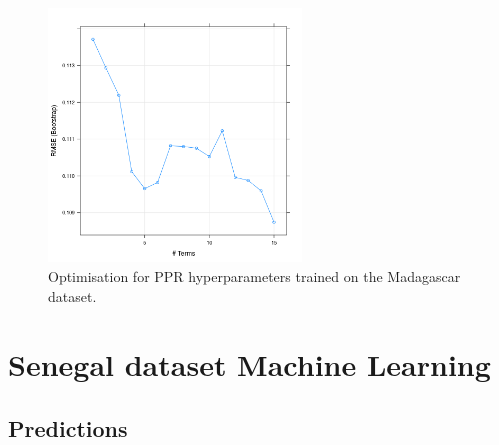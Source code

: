 \documentclass[review]{elsarticle}
\begin{document}
\begin{figure}[h!]
  \centering
  \includegraphics[width=0.6\textwidth]{figs/SI/ppropt_mdg.png}
\caption{
  Optimisation for PPR hyperparameters trained on the Madagascar dataset.
}

\end{figure}








\clearpage
\section{Senegal dataset Machine Learning}






\subsection{Predictions}
\end{document}
